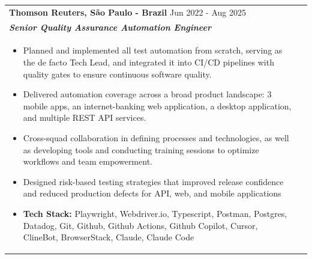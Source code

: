 \documentclass[a4paper,8pt]{article}
\begin{document}
\begin{tabularx}{\linewidth}{ @{}l r@{} }
\textbf{{Thomson Reuters, São Paulo - Brazil}} \hfill \color[HTML]{371e77} Jun 2022 - Aug 2025 \\[4pt]
\color[HTML]{371e77}\textbf{\textit{Senior Quality Assurance Automation Engineer}}\ \hfill \color[HTML]{4B28A4} \\[5pt]
\begin{minipage}[t]{\linewidth}
    \begin{itemize}[nosep,after=\strut, leftmargin=2em, itemsep=2pt]
        \item Planned and implemented all test automation from scratch, serving as the de facto Tech Lead, and integrated it into CI/CD pipelines with quality gates to ensure continuous software quality.
        \item Delivered automation coverage across a broad product landscape: 3 mobile apps, an internet-banking web application, a desktop application, and multiple REST API services.
        \item Cross-squad collaboration in defining processes and technologies, as well as developing tools and conducting training sessions to optimize workflows and team empowerment.
        \item Designed risk-based testing strategies that improved release confidence and reduced production defects for API, web, and mobile applications
        \item \textbf{Tech Stack:} Playwright, Webdriver.io, Typescript, Postman, Postgres, Datadog, Git, Github, Github Actions, Github Copilot, Cursor, ClineBot, BrowserStack, Claude, Claude Code
    \end{itemize}
\end{minipage}
\end{tabularx}
\end{document}
